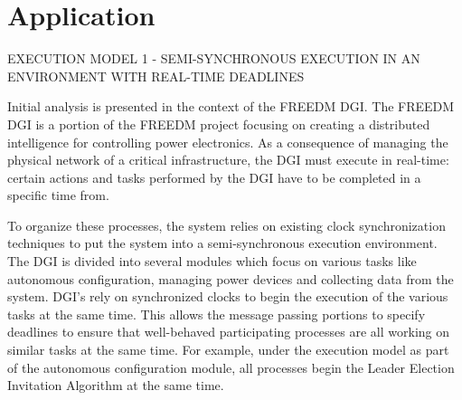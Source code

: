 \documentclass[12pt,oneside]{article}
\begin{document}




\section{Application}

EXECUTION MODEL 1 - SEMI-SYNCHRONOUS EXECUTION IN AN ENVIRONMENT WITH REAL-TIME DEADLINES


Initial analysis is presented in the context of the FREEDM DGI. The FREEDM DGI is a portion of the FREEDM project focusing on creating a distributed intelligence for controlling power electronics. As a consequence of managing the physical network of a critical infrastructure, the DGI must execute in real-time: certain actions and tasks performed by the DGI have to be completed in a specific time from.

To organize these processes, the system relies on existing clock synchronization techniques to put the system into a semi-synchronous execution environment. The DGI is divided into several modules which focus on various tasks like autonomous configuration, managing power devices and collecting data from the system. DGI's rely on synchronized clocks to begin the execution of the various tasks at the same time. This allows the message passing portions to specify deadlines to ensure that well-behaved participating processes are all working on similar tasks at the same time. For example, under the execution model as part of the autonomous configuration module, all processes begin the Leader Election Invitation Algorithm at the same time.
\end{document}
